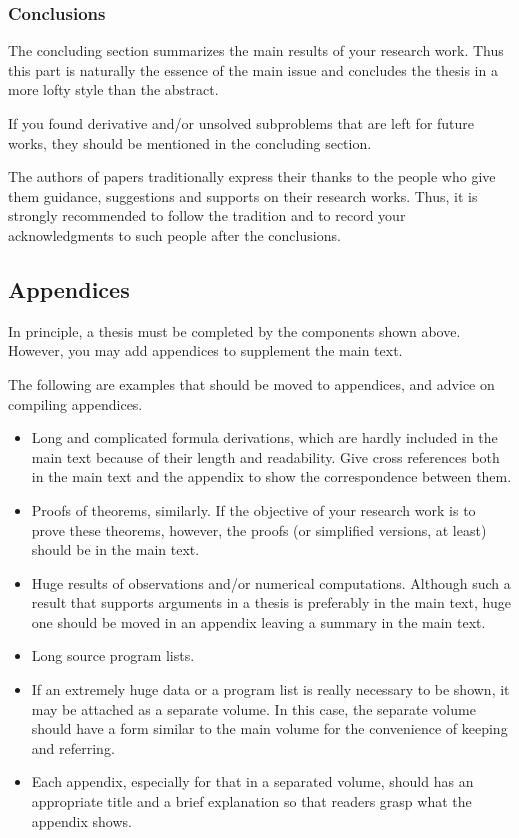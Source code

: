 \documentclass[english]{kuisthesis}
\begin{document}
\subsubsection{Conclusions}\label{subsubsec-conclusion}
The concluding section summarizes the main results of your research work.
Thus this part is naturally the essence of the main issue and concludes the
thesis in a more lofty style than the abstract.

If you found derivative and/or unsolved subproblems that are left for
future works, they should be mentioned in the concluding section.

The authors of papers traditionally express their thanks to the people who
give them guidance, suggestions and supports on their research works.  Thus,
it is strongly recommended to follow the tradition and to record your
acknowledgments to such people after the conclusions.

\subsection{Appendices}\label{subsec-appendix}
In principle, a thesis must be completed by the components shown above.
However, you may add appendices to supplement the main text.

The following are examples that should be moved to appendices, and advice
on compiling appendices.
\begin{itemize}%
\item
Long and complicated formula derivations, which are hardly included in the
main text because of their length and readability.  Give cross references
both in the main text and the appendix to show the correspondence between
them.
\item
Proofs of theorems, similarly.  If the objective of your research work is to
prove these theorems, however, the proofs (or simplified versions, at least)
should be in the main text.
\item
Huge results of observations and/or numerical computations.  Although such a
result that supports arguments in a thesis is preferably in the main text,
huge one should be moved in an appendix leaving a summary in the main text.
\item
Long source program lists.
\item
If an extremely huge data or a program list is really necessary to be shown,
it may be attached as a separate volume.  In this case, the separate volume
should have a form similar to the main volume for the convenience of keeping
and referring.
\item
Each appendix, especially for that in a separated volume, should has an
appropriate title and a brief explanation so that readers grasp what the
appendix shows.
\end{itemize}%
\end{document}
